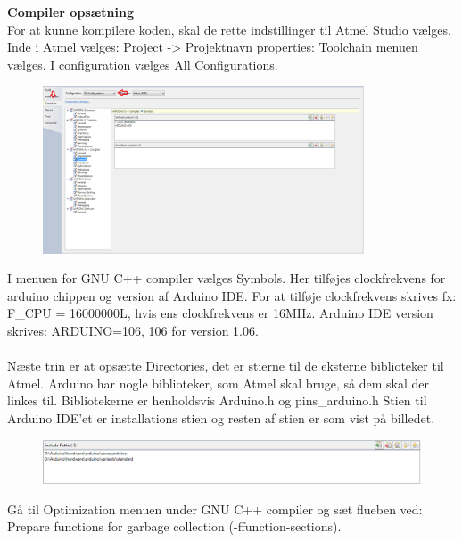 \textbf{Compiler opsætning} \\
For at kunne kompilere koden, skal de rette indstillinger til Atmel Studio vælges. 
Inde i Atmel vælges: Project -> Projektnavn properties:
Toolchain menuen vælges. I configuration vælges All Configurations.

\begin{figure}[H]
	\centering
	\includegraphics[width=0.85\textwidth]{Billeder/implementation/Howtoguide/atmel_toolchain.png}
\end{figure}

I menuen for GNU C++ compiler vælges Symbols. Her tilføjes clockfrekvens for arduino chippen og version af Arduino IDE.
For at tilføje clockfrekvens skrives fx: F\_CPU = 16000000L, hvis ens clockfrekvens er 16MHz.
Arduino IDE version skrives: ARDUINO=106, 106 for version 1.06. \\ \\

Næste trin er at opsætte Directories, det er stierne til de eksterne biblioteker til Atmel. Arduino har nogle biblioteker, som Atmel skal bruge, så dem skal der linkes til.
Bibliotekerne er henholdsvis Arduino.h og pins\_arduino.h
Stien til Arduino IDE'et er installations stien og resten af stien er som vist på billedet.
\begin{figure}[H]
	\centering
	\includegraphics[width=1\textwidth]{Billeder/implementation/Howtoguide/atmel_directories.png}
\end{figure}

Gå til Optimization menuen under GNU C++ compiler og sæt flueben ved: Prepare functions for garbage collection (-ffunction-sections).\\ \\

